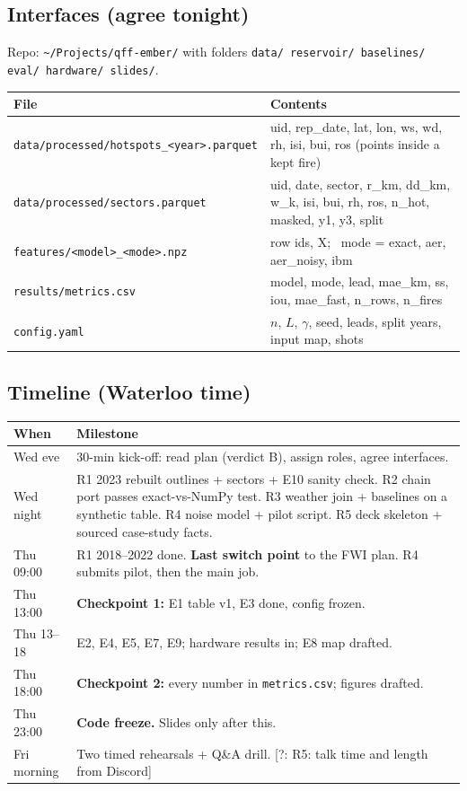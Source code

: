 \documentclass[11pt,a4paper]{article}
\newcommand{\tagbox}[2]{{\footnotesize\color{#1}\textsf{[#2]}}}
\newcommand{\todo}[1]{\tagbox{Orange!85!black}{?: #1}}        %
\newcommand{\code}[1]{\texttt{\small #1}}
\begin{document}
\subsection{Interfaces (agree tonight)}
Repo: \code{\textasciitilde/Projects/qff-ember/} with folders \code{data/ reservoir/ baselines/ eval/ hardware/
slides/}.
\begin{center}\small
\begin{tabularx}{\linewidth}{@{}l Y@{}}
\toprule
\textbf{File} & \textbf{Contents}\\
\midrule
\code{data/processed/hotspots\_<year>.parquet} & uid, rep\_date, lat, lon, ws, wd, rh, isi, bui, ros (points inside a
kept fire)\\
\code{data/processed/sectors.parquet} & uid, date, sector, r\_km, dd\_km, w\_k, isi, bui, rh, ros, n\_hot, masked, y1,
y3, split\\
\code{features/<model>\_<mode>.npz} & row ids, X; \ mode = exact, aer, aer\_noisy, ibm\\
\code{results/metrics.csv} & model, mode, lead, mae\_km, ss, iou, mae\_fast, n\_rows, n\_fires\\
\code{config.yaml} & $n$, $L$, $\gamma$, seed, leads, split years, input map, shots\\
\bottomrule
\end{tabularx}
\end{center}

\subsection{Timeline (Waterloo time)}
\begin{center}\small
\begin{tabularx}{\linewidth}{@{}l Y@{}}
\toprule
\textbf{When} & \textbf{Milestone}\\
\midrule
Wed eve & 30-min kick-off: read plan (verdict B), assign roles, agree interfaces.\\
Wed night & R1 2023 rebuilt outlines + sectors + E10 sanity check. R2 chain port passes exact-vs-NumPy test. R3 weather join + baselines on a
synthetic table. R4 noise model + pilot script. R5 deck skeleton + sourced case-study facts.\\
Thu 09:00 & R1 2018--2022 done. \textbf{Last switch point} to the FWI plan. R4 submits pilot, then the main job.\\
Thu 13:00 & \textbf{Checkpoint 1:} E1 table v1, E3 done, config frozen.\\
Thu 13--18 & E2, E4, E5, E7, E9; hardware results in; E8 map drafted.\\
Thu 18:00 & \textbf{Checkpoint 2:} every number in \code{metrics.csv}; figures drafted.\\
Thu 23:00 & \textbf{Code freeze.} Slides only after this.\\
Fri morning & Two timed rehearsals + Q\&A drill. \todo{R5: talk time and length from Discord}\\
\bottomrule
\end{tabularx}
\end{center}
\end{document}

